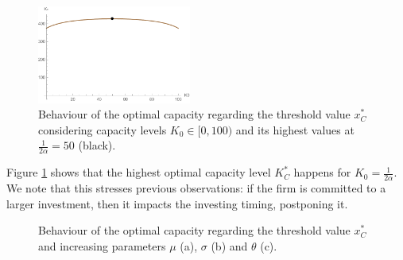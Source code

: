 \begin{figure}[!htb]
	\centering
	\includegraphics[width=0.45\textwidth]{Prob2_CapOpt/koptx_k0.pdf}
	\caption{Behaviour of the optimal capacity regarding the threshold value $x^*_C$ considering capacity levels $K_0 \in [0, 100)$ and its highest values at $\frac{1}{2 \alpha}=50$ (black).}
	\label{fig:2_k0}
\end{figure}

Figure \ref{fig:2_k0} shows that the highest optimal capacity level $K^*_C$ happens for $K_0=\frac{1}{2 \alpha}$.
We note that this stresses previous observations: if the firm is committed to a larger investment, then it impacts the investing timing, postponing it.

\vspace{0.5cm}

\begin{figure}[!htb]
	\begin{subfigmatrix}{3}
	\end{subfigmatrix}
	\caption{Behaviour of the optimal capacity regarding the threshold value $x^*_C$ and increasing parameters $\mu$ (a), $\sigma$ (b) and $\theta$ (c).}
	\label{fig:2_k1}
\end{figure}

